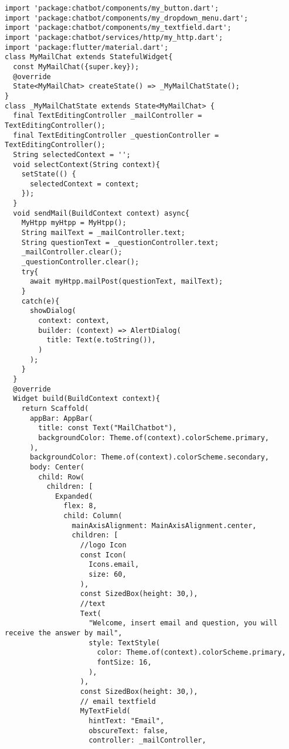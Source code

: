 \begin{lstlisting}[style=pythonstyle,caption={Codice del my\_mail\_chat.dart}, label={lst:mailchat}]
import 'package:chatbot/components/my_button.dart';
import 'package:chatbot/components/my_dropdown_menu.dart';
import 'package:chatbot/components/my_textfield.dart';
import 'package:chatbot/services/http/my_http.dart';
import 'package:flutter/material.dart';
class MyMailChat extends StatefulWidget{
  const MyMailChat({super.key});
  @override
  State<MyMailChat> createState() => _MyMailChatState();
}
class _MyMailChatState extends State<MyMailChat> {
  final TextEditingController _mailController = TextEditingController();
  final TextEditingController _questionController = TextEditingController();
  String selectedContext = '';
  void selectContext(String context){
    setState(() {
      selectedContext = context;
    });
  }
  void sendMail(BuildContext context) async{
    MyHtpp myHtpp = MyHtpp();
    String mailText = _mailController.text;
    String questionText = _questionController.text;
    _mailController.clear();
    _questionController.clear();
    try{
      await myHtpp.mailPost(questionText, mailText);
    }
    catch(e){
      showDialog(
        context: context, 
        builder: (context) => AlertDialog(
          title: Text(e.toString()),
        )
      );
    }
  }
  @override
  Widget build(BuildContext context){
    return Scaffold(
      appBar: AppBar(
        title: const Text("MailChatbot"),
        backgroundColor: Theme.of(context).colorScheme.primary,
      ),
      backgroundColor: Theme.of(context).colorScheme.secondary,
      body: Center(
        child: Row(
          children: [
            Expanded(
              flex: 8,
              child: Column(
                mainAxisAlignment: MainAxisAlignment.center,
                children: [
                  //logo Icon
                  const Icon(
                    Icons.email,
                    size: 60,
                  ),
                  const SizedBox(height: 30,),
                  //text
                  Text(
                    "Welcome, insert email and question, you will receive the answer by mail",
                    style: TextStyle(
                      color: Theme.of(context).colorScheme.primary,
                      fontSize: 16,
                    ),
                  ),
                  const SizedBox(height: 30,),
                  // email textfield
                  MyTextField(
                    hintText: "Email",
                    obscureText: false,
                    controller: _mailController,

\end{lstlisting}
